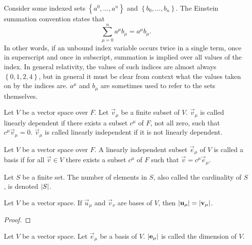 \documentclass[../main.tex]{subfiles}
\begin{document}
    \begin{notation}
        Consider some indexed sets \(\left\{a^{0},\dots,a^{n}\right\}\) and \(\left\{b_{0},\dots,b_{n}\right\}\). The Einstein summation convention states that
        \begin{equation*}
            \sum_{\mu=0}^{n}a^{\mu}b_{\mu}=a^{\mu}b_{\mu}.
        \end{equation*}
        In other words, if an unbound index variable occurs twice in a single term, once in superscript and once in subscript, summation is implied over all values of the index. In general relativity, the values of such indices are almost always \(\left\{0,1,2,4\right\}\), but in general it must be clear from context what the values taken on by the indices are. \(a^{\mu}\) and \(b_{\mu}\) are sometimes used to refer to the sets themselves.
    \end{notation}
    \begin{definition}
        Let \(V\) be a vector space over \(F\). Let \(\vec{v}_{\mu}\) be a finite subset of \(V\). \(\vec{v}_{\mu}\) is called linearly dependent if there exists a subset \(c^{\mu}\) of \(F\), not all zero, such that \(c^{\mu}\vec{v}_{\mu}=0\). \(\vec{v}_{\mu}\) is called linearly independent if it is not linearly dependent.
    \end{definition}
    \begin{definition}[Bases]
        Let \(V\) be a vector space over \(F\). A linearly independent subset \(\vec{e}_{\mu}\) of \(V\) is called a basis if for all \(\vec{v}\in{}V\) there exists a subset \(c^{\mu}\) of \(F\) such that \(\vec{v}=c^{\mu}\vec{e}_{\mu}\).
    \end{definition}
    \begin{notation}[Cardinality]
        Let \(S\) be a finite set. The number of elements in \(S\), also called the cardinality of \(S\), is denoted \(\lvert S\rvert\).
    \end{notation}
    \begin{theorem}
        Let \(V\) be a vector space. If \(\vec{u}_{\mu}\) and \(\vec{v}_{\nu}\) are bases of \(V\), then \(\lvert\mathbf{u}_{\mu}\rvert=\lvert\mathbf{v}_{\mu}\rvert\).
        \begin{proof}
        \end{proof}
    \end{theorem}
    \begin{definition}[Dimension]
        Let \(V\) be a vector space. Let \(\vec{e}_{\mu}\) be a basis of \(V\). \(\lvert\mathbf{e}_{\mu}\rvert\) is called the dimension of \(V\).
    \end{definition}
\end{document}
